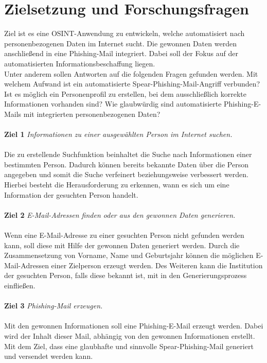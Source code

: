 \section{Zielsetzung und Forschungsfragen}
\label {sec:Zielsetzung}
Ziel ist es eine OSINT-Anwendung zu entwickeln, welche automatisiert nach personenbezogenen Daten im Internet sucht. Die gewonnen Daten werden anschließend in eine Phishing-Mail integriert. Dabei soll der Fokus auf der automatisierten Informationsbeschaffung liegen.\\ 
Unter anderem sollen Antworten auf die folgenden Fragen gefunden werden. Mit welchem Aufwand ist ein automatisierte Spear-Phishing-Mail-Angriff verbunden? Ist es möglich ein Personenprofil zu erstellen, bei dem ausschließlich korrekte Informationen vorhanden sind? Wie glaubwürdig sind automatisierte Phishing-E-Mails mit integrierten personenbezogenen Daten?
 \\\\
 {\bf Ziel 1} \textit{Informationen zu einer ausgewählten Person im Internet suchen.}\\\\
 Die zu erstellende Suchfunktion beinhaltet die Suche nach Informationen einer bestimmten Person. Dadurch können bereits bekannte Daten über die Person angegeben und somit die Suche verfeinert beziehungsweise verbessert werden. Hierbei besteht die Herausforderung zu erkennen, wann es sich um eine Information der gesuchten Person handelt.\\\\
 {\bf Ziel 2} \textit{E-Mail-Adressen finden oder aus den gewonnen Daten generieren.}\\\\
 Wenn eine E-Mail-Adresse zu einer gesuchten Person nicht gefunden werden kann, soll diese mit Hilfe der gewonnen Daten generiert werden. Durch die Zusammensetzung von Vorname, Name und Geburtsjahr können die möglichen E-Mail-Adressen einer Zielperson erzeugt werden. Des Weiteren kann die Institution der gesuchten Person, falls diese bekannt ist, mit in den Generierungsprozess einfließen.\\\\
 {\bf Ziel 3} \textit{Phishing-Mail erzeugen.}\\\\
 Mit den gewonnen Informationen soll eine Phishing-E-Mail erzeugt werden. Dabei wird der Inhalt dieser Mail, abhängig von den gewonnen Informationen erstellt. Mit dem Ziel, dass eine glaubhafte und sinnvolle Spear-Phishing-Mail generiert und versendet werden kann.
 

